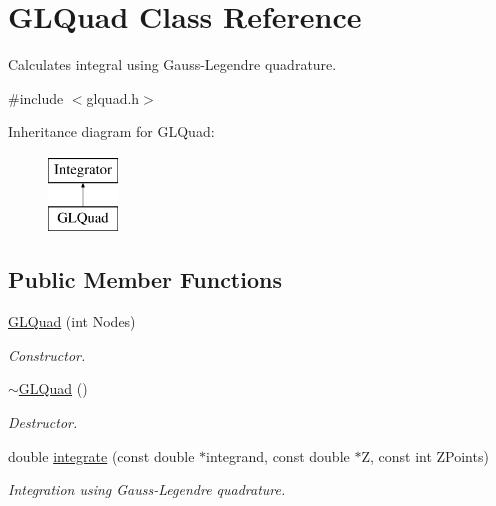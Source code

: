 \hypertarget{classGLQuad}{
\section{GLQuad Class Reference}
\label{db/d06/classGLQuad}
}


Calculates integral using Gauss-\/Legendre quadrature.  




{\ttfamily \#include $<$glquad.h$>$}

Inheritance diagram for GLQuad:\begin{figure}[H]
\begin{center}
\leavevmode
\includegraphics[height=2cm]{db/d06/classGLQuad}
\end{center}
\end{figure}
\subsection*{Public Member Functions}
\begin{DoxyCompactItemize}
\item 
\hyperlink{classGLQuad_a835d29af2507b6b2716794d3371d2ba8}{GLQuad} (int Nodes)
\begin{DoxyCompactList}\small\item\em Constructor. \item\end{DoxyCompactList}\item 
\hypertarget{classGLQuad_ad37beb73af53a94ca95ee8eddfe207ab}{
\hyperlink{classGLQuad_ad37beb73af53a94ca95ee8eddfe207ab}{$\sim$GLQuad} ()}
\label{db/d06/classGLQuad_ad37beb73af53a94ca95ee8eddfe207ab}

\begin{DoxyCompactList}\small\item\em Destructor. \item\end{DoxyCompactList}\item 
double \hyperlink{classGLQuad_a951e36d849cfadc749a62218212802b6}{integrate} (const double $\ast$integrand, const double $\ast$Z, const int ZPoints)
\begin{DoxyCompactList}\small\item\em Integration using Gauss-\/Legendre quadrature. \item\end{DoxyCompactList}\end{DoxyCompactItemize}


